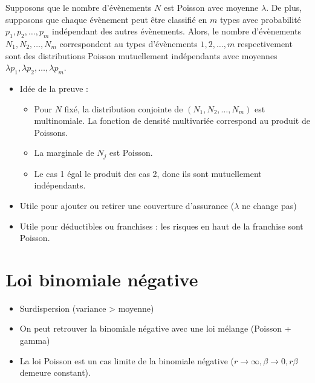 \begin{theoreme}{}{}
	Supposons que le nombre d'évènements $N$ est Poisson avec moyenne $\lambda$. De plus, supposons que chaque évènement peut être classifié en $m$ types avec probabilité $p_1, p_2, \dots, p_m$ indépendant des autres évènements. Alors, le nombre d'évènements $N_1, N_2, \dots, N_m$ correspondent au types d'évènements $1, 2, \dots, m$ respectivement sont des distributions Poisson mutuellement indépendants avec moyennes $\lambda p_1, \lambda p_2, \dots, \lambda p_m$.
	\tcblower
	\begin{itemize}
		\item Idée de la preuve : 
		\begin{itemize}
			\item Pour $N$ fixé, la distribution conjointe de $(N_1, N_2, \dots, N_m)$ est multinomiale. La fonction de densité multivariée correspond au produit de Poissons. 
			\item La marginale de $N_j$ est Poisson. 
			\item Le cas 1 égal le produit des cas 2, donc ils sont mutuellement indépendants. 
		\end{itemize}
		\item Utile pour ajouter ou retirer une couverture d'assurance ($\lambda$ ne change pas)
		\item Utile pour déductibles ou franchises : les risques en haut de la franchise sont Poisson. 
	\end{itemize}
\end{theoreme}

\section{Loi binomiale négative}

\begin{itemize}
	\item Surdispersion (variance > moyenne)
	\item On peut retrouver la binomiale négative avec une loi mélange (Poisson + gamma)
	\item La loi Poisson est un cas limite de la binomiale négative ($r\to \infty, \beta \to 0, r\beta$ demeure constant).
\end{itemize}

